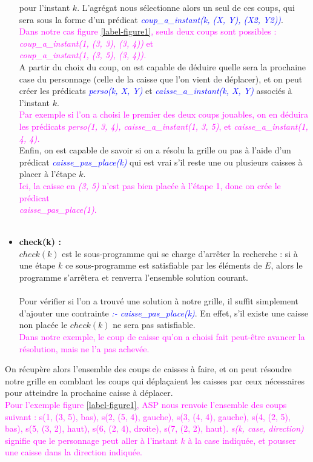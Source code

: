 \documentclass[10pt,a4paper]{article}
\begin{document}
\begin{itemize}
		pour l'instant $k$. L'agrégat nous sélectionne alors un seul de ces coups, qui sera sous la forme d'un prédicat \emph{\textcolor{blue}{coup\_a\_instant(k, (X, Y), (X2, Y2))}}.\\
		\textcolor{magenta}{Dans notre cas figure \ref{label-figure1}, seuls deux coups sont possibles : \emph{coup\_a\_instant(1, (3, 3), (3, 4))} et \\
		\emph{coup\_a\_instant(1, (3, 5), (3, 4)).}}\\
		A partir du choix du coup, on est capable de déduire quelle sera la prochaine case du personnage (celle de la caisse que l'on vient de déplacer), et on peut créer les prédicats 
		\emph{\textcolor{blue}{perso(k, X, Y)}} et \emph{\textcolor{blue}{caisse\_a\_instant(k, X, Y)}} associés à l'instant $k$.\\
		\textcolor{magenta}{Par exemple si l'on a choisi le premier des deux coups jouables, on en déduira les prédicats \emph{perso(1, 3, 4), caisse\_a\_instant(1, 3, 5)}, et \emph{caisse\_a\_instant(1, 4, 4).}}\\
		Enfin, on est capable de savoir si on a résolu la grille ou pas à l'aide d'un prédicat \emph{\textcolor{blue}{caisse\_pas\_place(k)}} qui est vrai s'il reste une ou plusieurs caisses à placer à l'étape $k$.\\
		\textcolor{magenta}{Ici, la caisse en \emph{(3, 5)} n'est pas bien placée à l'étape 1, donc on crée le prédicat \\
		\emph{caisse\_pas\_place(1)}.}\\ \\
	\item \textbf{check(k) :}\\
		$check(k)$ est le sous-programme qui se charge d'arrêter la recherche : si à une étape $k$ ce sous-programme est satisfiable par les éléments de $E$, alors le programme s'arrêtera et renverra l'ensemble solution 
		courant.\\ \\
		Pour vérifier si l'on a trouvé une solution à notre grille, il suffit simplement d'ajouter une contrainte \emph{\textcolor{blue}{:- caisse\_pas\_place(k)}}. En effet, s'il existe une caisse non placée le 
		$check(k)$ ne sera pas satisfiable.\\
		\textcolor{magenta}{Dans notre exemple, le coup de caisse qu'on a choisi fait peut-être avancer la résolution, mais ne l'a pas achevée.}\\
\end{itemize}
On récupère alors l'ensemble des coups de caisses à faire, et on peut résoudre notre grille en comblant les coups qui déplaçaient les caisses par ceux nécessaires pour atteindre la prochaine caisse à déplacer.\\
\textcolor{magenta}{Pour l'exemple figure \ref{label-figure1}, ASP nous renvoie l'ensemble des coups suivant : s(1, (3, 5), bas), s(2, (5, 4), gauche), s(3, (4, 4), gauche), s(4, (2, 5), bas), s(5, (3, 2), haut), s(6, (2, 4), 
droite), s(7, (2, 2), haut). \emph{s(k, case, direction)} signifie que le personnage peut aller à l'instant $k$ à la case indiquée, et pousser une caisse dans la direction indiquée.}
\end{document}
